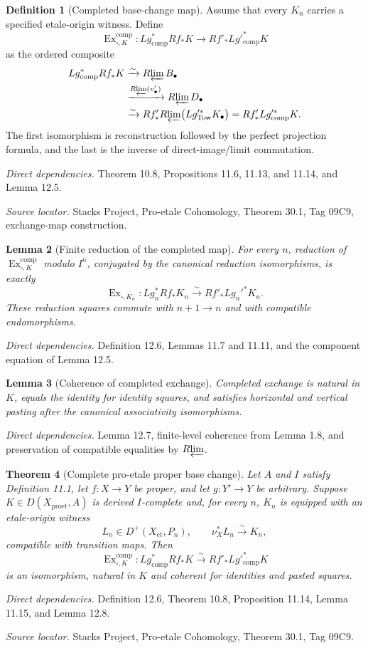 \documentclass[10pt]{article}
\newtheorem{theorem}{Theorem}[section]
\newtheorem{lemma}[theorem]{Lemma}
\theoremstyle{definition}
\newtheorem{definition}[theorem]{Definition}
\newcommand{\Rlim}{R\!\varprojlim}
\newcommand{\Dplus}{D^+}
\newcommand{\Et}{\mathrm{et}}
\newcommand{\Proet}{\mathrm{proet}}
\newcommand{\Ex}{\operatorname{Ex}}
\newcommand{\deps}[1]{\par\smallskip\textit{Direct dependencies.} #1\par}
\newcommand{\sources}[1]{\par\textit{Source locator.} #1\par}
\begin{document}
\begin{definition}[Completed base-change map]
Assume that every $K_n$ carries a specified etale-origin witness.  Define
\[
 \Ex^{\mathrm{comp}}_{\square,K}:
 Lg^*_{\mathrm{comp}}Rf_*K
 \longrightarrow Rf'_*Lg'^*_{\mathrm{comp}}K
\]
as the ordered composite
\[
\begin{aligned}
 Lg^*_{\mathrm{comp}}Rf_*K
 &\xrightarrow{\sim}\Rlim B_\bullet\\
 &\xrightarrow{\Rlim(v'_\bullet)}\Rlim D_\bullet\\
 &\xrightarrow{\sim}
 Rf'_*\Rlim\bigl(Lg'^*_{\operatorname{Tow}}K_\bullet\bigr)
 =Rf'_*Lg'^*_{\mathrm{comp}}K.
\end{aligned}
\]
The first isomorphism is reconstruction followed by the perfect projection
formula, and the last is the inverse of direct-image/limit commutation.
\end{definition}
\deps{Theorem 10.8, Propositions 11.6, 11.13, and 11.14, and Lemma 12.5.}
\sources{Stacks Project, Pro-etale Cohomology, Theorem 30.1, Tag 09C9,
exchange-map construction.}

\begin{lemma}[Finite reduction of the completed map]
For every $n$, reduction of $\Ex^{\mathrm{comp}}_{\square,K}$ modulo
$I^n$, conjugated by the canonical reduction isomorphisms, is exactly
\[
 \Ex_{\square,K_n}:Lg_n^*Rf_*K_n
 \xrightarrow{\sim}Rf'_*Lg_n'^*K_n.
\]
These reduction squares commute with $n+1\to n$ and with compatible
endomorphisms.
\end{lemma}
\deps{Definition 12.6, Lemmas 11.7 and 11.11, and the component equation
of Lemma 12.5.}

\begin{lemma}[Coherence of completed exchange]
Completed exchange is natural in $K$, equals the identity for identity
squares, and satisfies horizontal and vertical pasting after the canonical
associativity isomorphisms.
\end{lemma}
\deps{Lemma 12.7, finite-level coherence from Lemma 1.8, and preservation
of compatible equalities by $\Rlim$.}

\begin{theorem}[Complete pro-etale proper base change]
Let $A$ and $I$ satisfy Definition 11.1, let $f:X\to Y$ be proper, and let
$g:Y'\to Y$ be arbitrary.  Suppose $K\in D(X_{\Proet},A)$ is derived
$I$-complete and, for every $n$, $K_n$ is equipped with an etale-origin
witness
\[
 L_n\in\Dplus(X_{\Et},P_n),
 \qquad \nu_X^*L_n\xrightarrow{\sim}K_n,
\]
compatible with transition maps.  Then
\[
 \Ex^{\mathrm{comp}}_{\square,K}:
 Lg^*_{\mathrm{comp}}Rf_*K
 \xrightarrow{\sim}Rf'_*Lg'^*_{\mathrm{comp}}K
\]
is an isomorphism, natural in $K$ and coherent for identities and pasted
squares.
\end{theorem}
\deps{Definition 12.6, Theorem 10.8, Proposition 11.14, Lemma 11.15, and
Lemma 12.8.}
\sources{Stacks Project, Pro-etale Cohomology, Theorem 30.1, Tag 09C9.}
\end{document}
